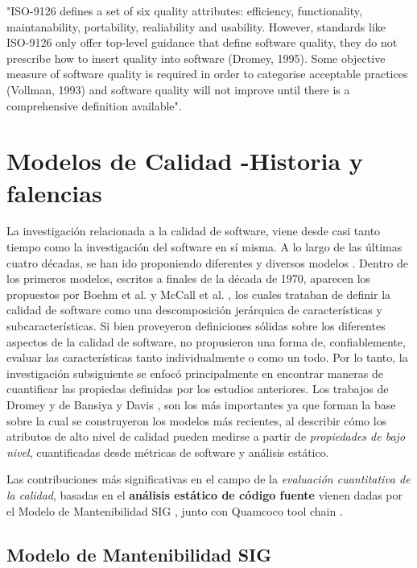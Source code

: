 "ISO-9126 defines a set of six quality attributes: efficiency, functionality, maintanability,
portability, realiability and usability.
However, standards like ISO-9126 only offer top-level guidance that define software quality,
they do not prescribe how to insert quality into software (Dromey, 1995).
Some objective measure of software quality is required in order to categorise acceptable
practices (Vollman, 1993) and software quality will not improve until there is a comprehensive
definition available"\cite{Relf04}.

\section{Modelos de Calidad -Historia y falencias}

La investigación relacionada a la calidad de software, viene desde casi tanto tiempo como
la investigación del software en sí misma.
A lo largo de las últimas cuatro décadas, se han ido proponiendo diferentes y diversos 
modelos \cite{Deissenboeck2009}.
Dentro de los primeros modelos, escritos a finales de la década de 1970, aparecen los
propuestos por Boehm et al. \cite{Boehm1978} y McCall et al. \cite{McCall1977}, los cuales trataban
de definir la calidad de software como una descomposición jerárquica de características y
subcaracterísticas.
Si bien proveyeron definiciones sólidas sobre los diferentes aspectos de la calidad de software,
no propusieron una forma de, confiablemente, evaluar las características tanto individualmente
o como un todo.
Por lo tanto, la investigación subsiguiente se enfocó principalmente en encontrar maneras de
cuantificar las propiedas definidas por los estudios anteriores.
Los trabajos de Dromey \cite{Dromey1995} y de Bansiya y Davis \cite{Bansiya2002}, son los más 
importantes ya que forman la base sobre la cual se construyeron los modelos más recientes, al 
describir cómo los atributos de alto nivel de calidad pueden medirse a partir de \textit{propiedades
de bajo nivel}, cuantificadas desde métricas de software y análisis estático.

Las contribuciones más significativas en el campo de la \textit{evaluación cuantitativa de la calidad},
basadas en el \textbf{análisis estático de código fuente} vienen dadas por el Modelo de Mantenibilidad 
SIG \cite{Heitlager2007}, junto con Quamcoco tool chain \cite{ref}.

\subsection{Modelo de Mantenibilidad SIG}

